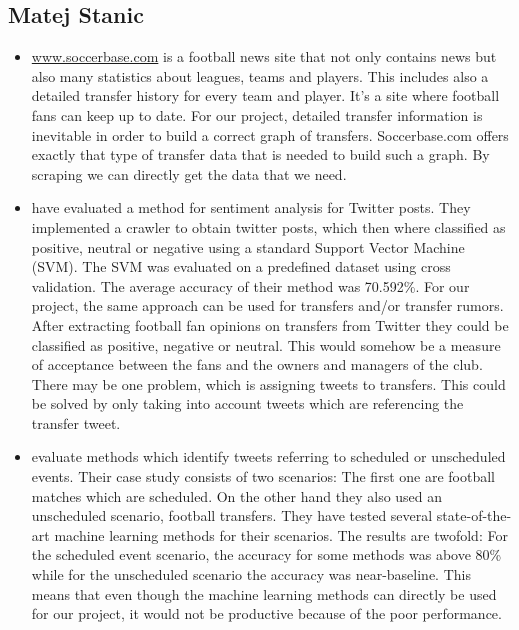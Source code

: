 \documentclass{article}
\begin{document}
\subsection{Matej Stanic}
\begin{itemize}
	\item \url{www.soccerbase.com} is a football news site that not only contains news but also many statistics about leagues, teams and players. This includes also a detailed transfer history for every team and player. It's a site where football fans can keep up to date. For our project, detailed transfer information is inevitable in order to build a correct graph of transfers. Soccerbase.com offers exactly that type of transfer data that is needed to build such a graph. By scraping we can directly get the data that we need.
	\item \cite{Shrivatava2014} have evaluated a method for sentiment analysis for Twitter posts. They implemented a crawler to obtain twitter posts, which then where classified as positive, neutral or negative using a standard Support Vector Machine (SVM). The SVM was evaluated on a predefined dataset using cross validation. The average accuracy of their method was 70.592\%. For our project, the same approach can be used for transfers and/or transfer rumors. After extracting football fan opinions on transfers from Twitter they could be classified as positive, negative or neutral. This would somehow be a measure of acceptance between the fans and the owners and managers of the club. There may be one problem, which is assigning tweets to transfers. This could be solved by only taking into account tweets which are referencing the transfer tweet.
	\item \cite{Kunneman+12} evaluate methods which identify tweets referring to scheduled or unscheduled events. Their case study consists of two scenarios: The first one are football matches which are scheduled. On the other hand they also used an unscheduled scenario, football transfers. They have tested several state-of-the-art machine learning methods for their scenarios. The results are twofold: For the scheduled event scenario, the accuracy for some methods was above 80\% while for the unscheduled scenario the accuracy was near-baseline. This means that even though the machine learning methods can directly be used for our project, it would not be productive because of the poor performance. 
\end{itemize}
\end{document}
